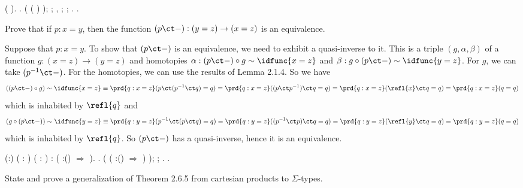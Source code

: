 \begin{coqdoccode}
\coqdocindent{1.00em}
 (  ).\coqdoceol
\coqdocnoindent
{}.\coqdoceol
\coqdocindent{1.00em}
 ( \coqdocvar{\_} (  ) \coqdocvar{\_} \coqdocvar{\_});  ;\coqdoceol
\coqdocindent{2.00em}
 , ; ; .\coqdoceol
\coqdocnoindent
{}.\coqdoceol
\coqdocemptyline
\end{coqdoccode}
Prove that if $p : x = y$, then the function $(p \ct -) : (y = z) \to (x = z)$
is an equivalence.


 \soln
Suppose that $p : x = y$.  To show that $(p \ct -)$ is an equivalence, we need
to exhibit a quasi-inverse to it.  This is a triple $(g, \alpha, \beta)$ of a
function $g:(x = z) \to (y = z)$ and homotopies $\alpha : (p \ct -) \circ g \sim
\idfunc{x=z}$ and $\beta : g \circ (p \ct -) \sim \idfunc{y=z}$.  For $g$, we
can take $(p^{-1} \ct -)$.  For the homotopies, we can use the results of Lemma
2.1.4.  So we have
\[
((p \ct -) \circ g) \sim \idfunc{x=z}
\equiv
\prd{q:x=z}(p \ct (p^{-1} \ct q) = q)
=
\prd{q:x=z}((p \ct p^{-1}) \ct q = q)
=
\prd{q:x=z}(\refl{x} \ct q = q)
=
\prd{q:x=z}(q = q)
\]
which is inhabited by $\refl{q}$ and
\[
(g \circ (p \ct -)) \sim \idfunc{y=z}
\equiv
\prd{q:y=z}(p^{-1} \ct (p \ct q) = q)
=
\prd{q:y=z}((p^{-1} \ct p) \ct q = q)
=
\prd{q:y=z}(\refl{y} \ct q = q)
=
\prd{q:y=z}(q = q)
\]
which is inhabited by $\refl{q}$.  So $(p \ct -)$ has a quasi-inverse, hence it
is an equivalence.
\begin{coqdoccode}
\coqdocemptyline
\coqdocnoindent
{}  (:) (   : ) ( :  \coqdocnotation{=} ) :  ( :(\coqdocnotation{=}) \ensuremath{\Rightarrow}   ).\coqdoceol
\coqdocnoindent
{}.\coqdoceol
\coqdocindent{1.00em}
 ( \coqdocvar{\_} ( :(\coqdocnotation{=}) \ensuremath{\Rightarrow} \coqdocnotation{\^{}}  ) \coqdocvar{\_} \coqdocvar{\_});  ;\coqdoceol
\coqdocindent{2.00em}
 .\coqdoceol
\coqdocnoindent
{}.\coqdoceol
\coqdocemptyline
\end{coqdoccode}
State and prove a generalization of Theorem 2.6.5 from cartesian products to
$\Sigma$-types.


